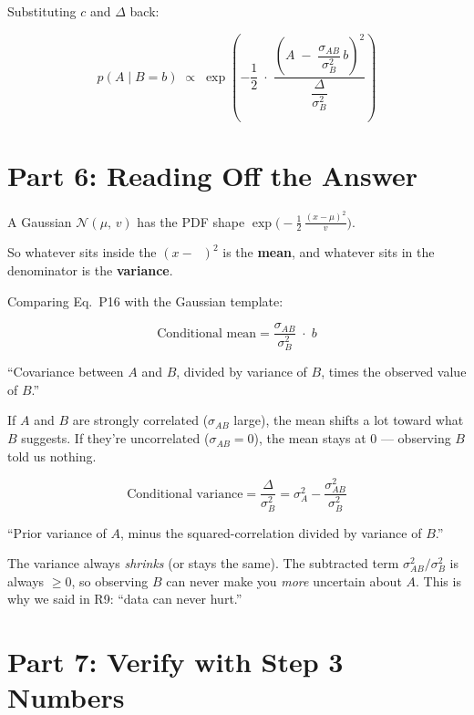 \documentclass[11pt, a4paper]{article}
\newcommand{\gut}[1]{\begin{tcolorbox}[colback=lightyellow, colframe=orange!50, title=Gut feeling]#1\end{tcolorbox}}
\newcommand{\recap}[1]{\begin{tcolorbox}[colback=lightblue, colframe=secblue!50, title=Recap]#1\end{tcolorbox}}
\begin{document}
Substituting $c$ and $\Delta$ back:

\begin{equation}
\boxed{
p(A \mid B = b) \;\propto\; \exp\!\left( -\frac{1}{2} \;\cdot\; \frac{\left(A \;-\; \dfrac{\sigma_{AB}}{\sigma_B^2}\,b\right)^2}{\dfrac{\Delta}{\sigma_B^2}} \right)
}
\tag{P16}
\end{equation}


\section*{\color{secblue}Part 6: Reading Off the Answer}

\recap{
A Gaussian $\mathcal{N}(\mu,\, v)$ has the PDF shape $\exp\!\Big(-\frac{1}{2}\,\frac{(x - \mu)^2}{v}\Big)$.

So whatever sits inside the $(x - \boxed{\phantom{x}})^2$ is the \textbf{mean}, and whatever sits in the denominator is the \textbf{variance}.
}

\bigskip
Comparing Eq.~P16 with the Gaussian template:

\begin{equation}
\boxed{\text{Conditional mean} = \frac{\sigma_{AB}}{\sigma_B^2} \;\cdot\; b}
\tag{P17}
\end{equation}

``Covariance between $A$ and $B$, divided by variance of $B$, times the observed value of $B$.''

\gut{
If $A$ and $B$ are strongly correlated ($\sigma_{AB}$ large), the mean shifts a lot toward what $B$ suggests. If they're uncorrelated ($\sigma_{AB} = 0$), the mean stays at 0 --- observing $B$ told us nothing.
}

\begin{equation}
\boxed{\text{Conditional variance} = \frac{\Delta}{\sigma_B^2} = \sigma_A^2 - \frac{\sigma_{AB}^2}{\sigma_B^2}}
\tag{P18}
\end{equation}

``Prior variance of $A$, minus the squared-correlation divided by variance of $B$.''

\gut{
The variance always \emph{shrinks} (or stays the same). The subtracted term $\sigma_{AB}^2 / \sigma_B^2$ is always $\geq 0$, so observing $B$ can never make you \emph{more} uncertain about $A$. This is why we said in R9: ``data can never hurt.''
}


\section*{\color{secblue}Part 7: Verify with Step 3 Numbers}
\end{document}
